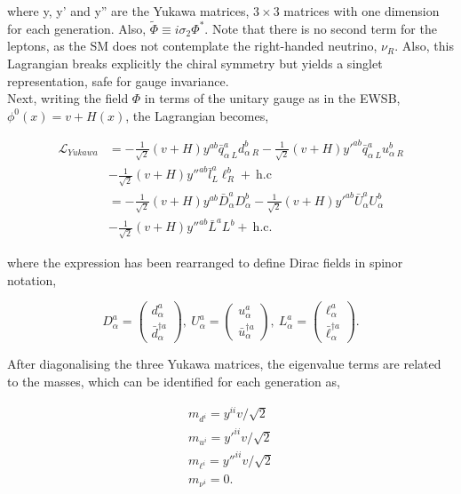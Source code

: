 where y, y' and y'' are the Yukawa matrices, $3\times3$ matrices with one dimension for each generation. Also, $\tilde{\Phi}\equiv i\sigma_2\Phi^*$. Note that there is no second term for the leptons, as the SM does not contemplate the right-handed neutrino, $\nu_R$. Also, this Lagrangian breaks explicitly the chiral symmetry but yields a singlet representation, safe for gauge invariance.\\

Next, writing the field $\Phi$ in terms of the unitary gauge as in the EWSB, $\phi^0(x)=v+H(x)$, the Lagrangian becomes,

\begin{equation}
\begin{split}
    \mathcal{L}_{Yukawa} &= -\frac{1}{\sqrt{2}}(v+H)y^{ab}\bar{q}^a_{\alpha\ L} d^b_{\alpha\ R} - \frac{1}{\sqrt{2}}(v+H)y'^{ab}\bar{q}^a_{\alpha\ L}u^b_{\alpha\ R}\\
    &-\frac{1}{\sqrt{2}}(v+H)y''^{ab}\bar{l}^a_{L}\ell^b_{R}+\ \text{h.c}\\
    &=-\frac{1}{\sqrt{2}}(v+H)y^{ab} \bar{D}^a_\alpha D^b_\alpha - \frac{1}{\sqrt{2}}(v+H)y'^{ab}\bar{U}^a_\alpha U^b_\alpha\\
    &-\frac{1}{\sqrt{2}}(v+H)y''^{ab}\bar{L}^a L^b+\ \text{h.c}.
\end{split}
\end{equation}

where the expression has been rearranged to define Dirac fields in spinor notation,

\begin{equation}
\label{Theory_eq:Diracmassspace}
    D_\alpha^a = \begin{pmatrix} d_\alpha^a \\ \bar{d}^{\dag a}_\alpha \end{pmatrix},\ 
    U_\alpha^a = \begin{pmatrix} u_\alpha^a \\ \bar{u}^{\dag a}_\alpha \end{pmatrix},\ 
    L_\alpha^a = \begin{pmatrix} \ell_\alpha^a \\ \bar{\ell}^{\dag a}_\alpha \end{pmatrix}.
\end{equation}

After diagonalising the three Yukawa matrices, the eigenvalue terms are related to the masses, which can be identified for each generation as,

\begin{equation}
\begin{split}
m_{d^i} = y^{ii}v/\sqrt{2} \\ 
m_{u^i} = y'^{ii}v/\sqrt{2} \\
m_{\ell^i} = y''^{ii}v/\sqrt{2} \\
m_{\nu^i} = 0.
\end{split}
\label{Theory_eq:yukawacouplings}
\end{equation}

